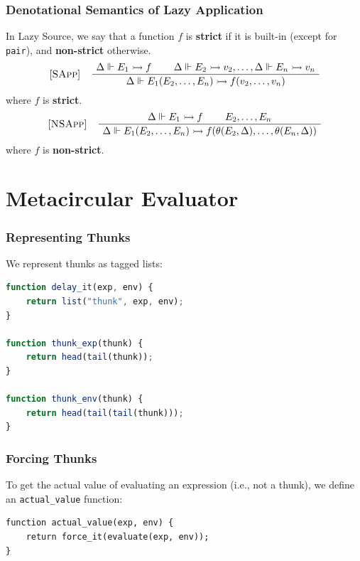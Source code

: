 \documentclass[12pt]{beamer}
\makeatletter
\newenvironment{boxedprooftree}[1][c]
 {\begin{tabular}[#1]{@{}c@{}}}
 {\DisplayProof\end{tabular}}
\makeatother
\begin{document}
\begin{frame}
\frametitle{Denotational Semantics of Lazy Application}
In Lazy Source, we say that a function $f$ is \textbf{strict} if it is built-in (except for \texttt{pair}), and \textbf{non-strict} otherwise.\pause
\[
\begin{tabular}{@{} l c @{}}
[\textsc{SApp}] &
  \begin{boxedprooftree}
  \AxiomC{$\Delta\Vdash E_1\rightarrowtail f$}
  \AxiomC{$\Delta\Vdash E_2\rightarrowtail v_2,\ldots,\Delta\Vdash E_n\rightarrowtail v_n$}
  \BinaryInfC{$\Delta\Vdash E_1(E_2,\ldots,E_n)\rightarrowtail f(v_2,\ldots,v_n)$}
  \end{boxedprooftree}
\end{tabular}
\]
where $f$ is \textbf{strict}.\pause
\[
\begin{tabular}{@{} l c @{}}
[\textsc{NSApp}] &
  \begin{boxedprooftree}
  \AxiomC{$\Delta\Vdash E_1\rightarrowtail f$}
  \AxiomC{$E_2,\ldots,E_n$}
  \BinaryInfC{$\Delta\Vdash E_1(E_2,\ldots,E_n)\rightarrowtail f(\theta(E_2,\Delta),\ldots,\theta(E_n,\Delta))$}
  \end{boxedprooftree}
\end{tabular}
\]
where $f$ is \textbf{non-strict}.
\end{frame}
\section{Metacircular Evaluator}
\begin{frame}[fragile]
\frametitle{Representing Thunks}
We represent thunks as tagged lists:
\begin{lstlisting}[language=JavaScript]
function delay_it(exp, env) {
    return list("thunk", exp, env);
}

function thunk_exp(thunk) {
    return head(tail(thunk));
}

function thunk_env(thunk) {
    return head(tail(tail(thunk)));
}
\end{lstlisting}
\end{frame}

\begin{frame}[fragile]
\frametitle{Forcing Thunks}
To get the actual value of evaluating an expression (i.e., not a thunk), we define an \texttt{actual\_value} function:
\begin{lstlisting}
function actual_value(exp, env) {
    return force_it(evaluate(exp, env));
}
\end{lstlisting}
\end{frame}
\end{document}
